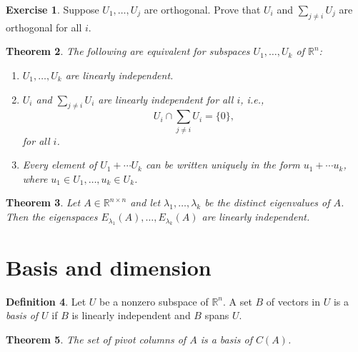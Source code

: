 \documentclass[fullpage]{amsart}
\newcommand{\RR}{\mathbb{R}}
\newtheorem{theorem}{Theorem}[section]
\theoremstyle{definition}
\newtheorem{definition}[theorem]{Definition}
\newtheorem{exercise}[theorem]{Exercise}
\begin{document}
\begin{exercise}
  Suppose $U_1,\ldots,U_j$ are orthogonal. Prove that $U_i$ and $\sum_{j\neq i}U_j$ are orthogonal for all $i$.
\end{exercise}

\begin{theorem}
  The following are equivalent for subspaces $U_1,\ldots,U_k$ of $\RR^n$:
  \begin{enumerate}
    \item $U_1,\ldots,U_k$ are linearly independent.
    \item $U_i$ and $\sum_{j\neq i} U_i$ are linearly independent for all $i$, i.e.,
  $$
  U_i\cap \sum_{j\neq i} U_i = \{0\},
  $$
  for all $i$.
  \item Every element of $U_1+\cdots U_k$ can be written uniquely in the form $u_1+\cdots u_k$, where $u_1\in U_1,\ldots,u_k\in U_k$.
  \end{enumerate}
\end{theorem}

\begin{theorem}
  Let $A\in\RR^{n\times n}$ and let $\lambda_1,\ldots,\lambda_k$ be the distinct eigenvalues of $A$.
  Then the eigenspaces $E_{\lambda_1}(A),\ldots,E_{\lambda_k}(A)$ are linearly independent.
\end{theorem}

\section{Basis and dimension}

\begin{definition}
  Let $U$ be a nonzero subspace of $\RR^n$.
  A set $B$ of vectors in $U$ is a \emph{basis of $U$} if $B$ is linearly independent and $B$ spans $U$.
\end{definition}

\begin{theorem}
  The set of pivot columns of $A$ is a basis of $C(A)$.
\end{theorem}
\end{document}

